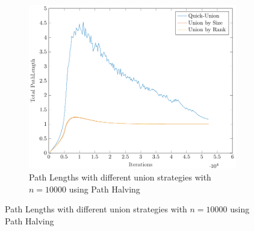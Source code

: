 \begin{figure}[ht]
    \hfill
    \begin{subfigure}{0.32\textwidth}
        \centering
        \includegraphics[width=\textwidth]{../images/plotPHFull10000_PathLength.pdf}
        \caption{Path Lengths with different union strategies with $n = 10000$ using Path Halving}
    \end{subfigure}


\end{figure}
